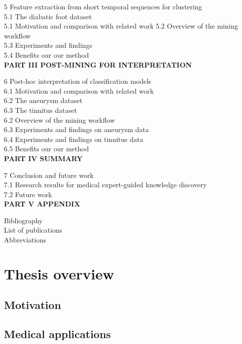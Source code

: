 \documentclass[
]{book}
\begin{document}
5 Feature extraction from short temporal sequences for clustering\\
5.1 The diabatic foot dataset\\
5.1 Motivation and comparison with related work 5.2 Overview of the mining workflow\\
5.3 Experiments and findings\\
5.4 Benefits our our method\\

\textbf{PART III POST-MINING FOR INTERPRETATION}

6 Post-hoc interpretation of classification models\\
6.1 Motivation and comparison with related work\\
6.2 The aneurysm dataset\\
6.3 The tinnitus dataset\\
6.2 Overview of the mining workflow\\
6.3 Experiments and findings on aneurysm data\\
6.4 Experiments and findings on tinnitus data\\
6.5 Benefits our our method\\

\textbf{PART IV SUMMARY}

7 Conclusion and future work\\
7.1 Research results for medical expert-guided knowledge discovery\\
7.2 Future work\\

\textbf{PART V APPENDIX}

Bibliography\\
List of publications\\
Abbreviations\\

\hypertarget{intro}{%
\chapter{Thesis overview}\label{intro}}

\hypertarget{motivation}{%
\section{Motivation}\label{motivation}}

\hypertarget{medical-applications}{%
\section{Medical applications}\label{medical-applications}}
\end{document}
